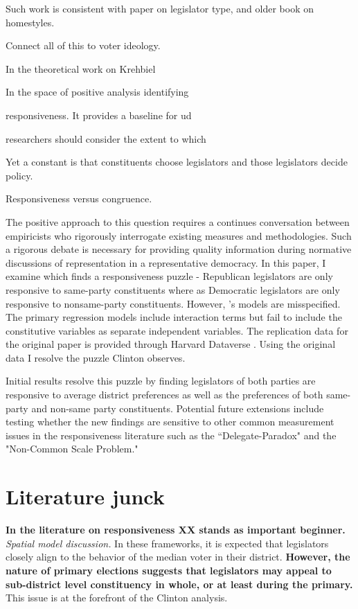 \documentclass[10pt,letterpaper]{article}
\begin{document}
Such work is consistent with paper on legislator type, and older book on homestyles.

Connect all of this to voter ideology. 


In the theoretical work on Krehbiel

In the space of positive analysis identifying 


responsiveness. It provides a baseline for ud

 researchers should consider the extent to which 

Yet a constant is that constituents choose legislators and those legislators decide policy.




Responsiveness versus congruence.




The positive approach to this question requires a continues conversation between empiricists who rigorously interrogate existing measures and methodologies. Such a rigorous debate is necessary for providing quality information during normative discussions of representation in a representative democracy. In this paper, I examine \cite{Clinton2006} which finds a responsiveness puzzle - Republican legislators are only responsive to same-party constituents where as Democratic legislators are only responsive to nonsame-party constituents. However, \cite{Clinton2006}'s models are misspecified. The primary regression models include interaction terms but fail to include the constitutive variables as separate independent variables. The replication data for the original paper is provided through Harvard Dataverse \cite{Clinton2009}. Using the original data I resolve the puzzle Clinton observes.  


Initial results resolve this puzzle by finding legislators of both parties are responsive to average district preferences as well as the preferences of both same-party and non-same party constituents. Potential future extensions include  testing whether the new findings are sensitive to other common measurement issues in the responsiveness literature such as the ``Delegate-Paradox" and the "Non-Common Scale Problem."

\section{Literature junck} 
\textbf{In the literature on responsiveness XX stands as important beginner.} \textit{Spatial model discussion.} In these frameworks, it is expected that legislators closely align to the behavior of the median voter in their district. \textbf{However, the nature of primary elections suggests that legislators may appeal to sub-district level constituency in whole, or at least during the primary.} This issue is at the forefront of the Clinton analysis. 
\end{document}
